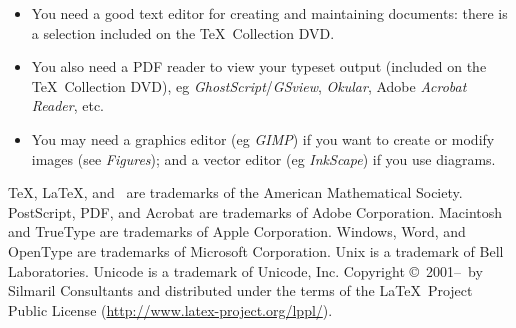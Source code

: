 \documentclass[fleqn]{article}
\begin{document}
\begin{multicols}{2}
\begin{itemize}[noitemsep]
\item You need a good text editor for creating and maintaining
  documents: there is a selection included on the \TeX\ Collection
  DVD.

\item You also need a PDF reader to view your typeset output (included
  on the \TeX\ Collection DVD), eg
  \textit{GhostScript}/\textit{GSview}, \textit{Okular}, Adobe
  \textit{Acrobat Reader}, etc.

\item You may need a graphics editor (eg \textit{GIMP}) if you want to
  create or modify images (see \textit{Figures}); and a vector editor (eg
  \textit{InkScape}) if you use diagrams.


\end{itemize} 

\end{multicols}
\vfill
\noindent
\begingroup{}\selectfont \TeX, \LaTeX, and \MF\ are trademarks
  of the American Mathematical Society. PostScript, PDF, and Acrobat
  are trademarks of Adobe Corporation. Macintosh and TrueType are
  trademarks of Apple Corporation. Windows, Word, and OpenType are
  trademarks of Microsoft Corporation. Unix is a trademark of Bell
  Laboratories. Unicode is a trademark of Unicode, Inc. Copyright
  \copyright\ 2001--\number\year\ by Silmaril Consultants and
  distributed under the terms of the \LaTeX\ Project Public License
  (\url{http://www.latex-project.org/lppl/}). 
\par\endgroup
\end{document}

